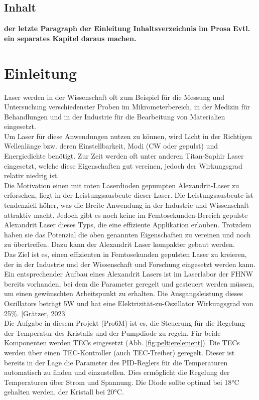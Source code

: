 \subsection*{Inhalt}
\textbf{der letzte Paragraph der Einleitung Inhaltsverzeichnis im Prosa} \textbf{Evtl. ein separates Kapitel daraus machen.}

\section{Einleitung}
Laser werden in der Wissenschaft oft zum Beispiel für die Messung und Untersuchung verschiedenster Proben im Mikrometerbereich, in der Medizin für Behandlungen und in der Industrie für die Bearbeitung von Materialien eingesetzt.\\
Um Laser für diese Anwendungen nutzen zu können, wird Licht in der Richtigen Wellenlänge bzw. deren Einstellbarkeit, Modi (CW oder gepulst) und Energiedichte benötigt. Zur Zeit werden oft unter anderen Titan-Saphir Laser eingesetzt, welche diese Eigenschaften gut vereinen, jedoch der Wirkungsgrad relativ niedrig ist.\\
Die Motivation einen mit roten Laserdioden gepumpten Alexandrit-Laser zu erforschen, liegt in der Leistungsausbeute dieser Laser. Die Leistungsausbeute ist tendenziell höher, was die Breite Anwendung in der Industrie und Wissenschaft attraktiv macht. Jedoch gibt es noch keine im Femtosekunden-Bereich gepulste Alexandrit Laser dieses Typs, die eine effiziente Applikation erlauben. Trotzdem haben sie das Potenzial die oben genannten Eigenschaften zu vereinen und noch zu übertreffen. Dazu kann der Alexandrit Laser kompakter gebaut werden.\\

Das Ziel ist es, einen effizienten in Femtosekunden gepulsten Laser zu kreieren, der in der Industrie und der Wissenschaft und Forschung eingesetzt werden kann.\\
Ein entsprechender Aufbau eines Alexandrit Lasers ist im Laserlabor der FHNW bereits vorhanden, bei dem die Parameter geregelt und gesteuert werden müssen, um einen gewünschten Arbeitspunkt zu erhalten. Die Ausgangsleistung dieses Oszillators beträgt 5W und hat eine Elektrizität-zu-Oszillator Wirkungsgrad von 25\%. [Grätzer, 2023]\\  %

Die Aufgabe in diesem Projekt (Pro6M) ist es,  die Steuerung für die Regelung der Temperatur des Kristalls und der Pumpdiode zu regeln. Für beide Komponenten werden TECs eingesetzt (Abb. \ref{fig:peltierelement}).  Die TECs werden über einen TEC-Kontroller (auch TEC-Treiber) geregelt. Dieser ist bereits in der Lage  die Parameter des PID-Reglers für die Temperaturen automatisch zu finden und einzustellen. Dies ermöglicht die Regelung der Temperaturen über Strom und Spannung. Die Diode sollte optimal bei 18°C gehalten werden, der Kristall bei 20°C.

